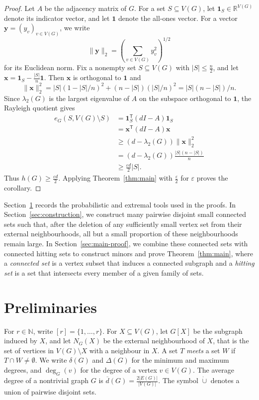 \documentclass[11pt,a4paper]{article}
\theoremstyle{definition}
\theoremstyle{remark}
\newcommand{\N}{\mathbb N}
\newcommand{\eps}{\varepsilon}
\begin{document}
\begin{proof}
Let $A$ be the adjacency matrix of $G$. For a set $S\subseteq V(G)$, let $\boldsymbol{1}_S\in\mathbb R^{V(G)}$ denote its indicator vector, and let $\boldsymbol{1}$ denote the all-ones vector. For a vector $\boldsymbol{y}=(y_v)_{v\in V(G)}$, we write
\[
 \|\boldsymbol{y}\|_2
 =\left(\sum_{v\in V(G)}y_v^2\right)^{1/2}
\]
for its Euclidean norm. Fix a nonempty set $S\subseteq V(G)$ with $|S|\le\frac{n}{2}$, and let
$\boldsymbol{x}=\boldsymbol{1}_S-\frac{|S|}{n}\boldsymbol{1}$. Then $\boldsymbol{x}$ is orthogonal to $\boldsymbol{1}$ and 
\[
\|\boldsymbol{x}\|_2^2=|S|(1-|S|/n)^2+(n-|S|)(|S|/n)^2=|S|(n-|S|)/n.
\]
Since $\lambda_2(G)$ is the largest eigenvalue of $A$ on the subspace orthogonal to $\boldsymbol{1}$, the Rayleigh quotient gives
\[
\begin{aligned}
 e_G(S,V(G)\setminus S)
 &=\boldsymbol{1}_S^{\mathsf T}(dI-A)\boldsymbol{1}_S\\
 &=\boldsymbol{x}^{\mathsf T}(dI-A)\boldsymbol{x}\\
 &\ge(d-\lambda_2(G))\|\boldsymbol{x}\|_2^2\\
 &=(d-\lambda_2(G))\frac{|S|(n-|S|)}{n}\\
 &\ge\frac{\eps d}{2}|S|.
\end{aligned}
\]
Thus $h(G)\ge\frac{\eps d}{2}$. Applying Theorem~\ref{thm:main} with $\frac{\eps}{2}$ for $\eps$ proves the corollary.
\end{proof}

Section~\ref{sec:preliminaries} records the probabilistic and extremal tools used in the proofs.  In Section~\ref{sec:construction}, we construct many pairwise disjoint small connected sets such that, after the deletion of
any sufficiently small vertex set from their external neighbourhoods, all but a small proportion of these neighbourhoods remain large.  In Section~\ref{sec:main-proof}, we combine these connected sets with connected hitting sets to construct minors and prove Theorem~\ref{thm:main}, where a  \emph{connected set} is 
a vertex subset  that induces a connected subgraph and a  \emph{hitting set} is a set that intersects every member of a given family of sets. 

\section{Preliminaries}\label{sec:preliminaries}

For $r\in\N$, write $[r]=\{1,\ldots,r\}$. For
$X\subseteq V(G)$, let $G[X]$ be the subgraph induced by $X$, and
let $N_G(X)$ be the external neighbourhood of $X$, that is the set of vertices in $V(G)\setminus X$ with a
neighbour in $X$. 
A set $T$ \emph{meets} a set $W$ if
$T\cap W\ne\emptyset$. We write $\delta(G)$ and $\Delta(G)$ for the
minimum and maximum degrees, and $\deg_G(v)$ for the degree of a
vertex $v\in V(G)$. The average degree of a nontrivial graph
$G$ is $\overline d(G)=\frac{2|E(G)|}{|V(G)|}$. The symbol
$\mathbin{\dot\cup}$ denotes a union of pairwise disjoint sets.
\end{document}
